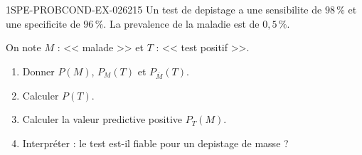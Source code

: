\begin{exercice}{1SPE-PROBCOND-EX-026}{2}{15}
Un test de depistage a une sensibilite de $98\,\%$ et une specificite de $96\,\%$. La prevalence de la maladie est de $0{,}5\,\%$.

On note $M$ : << malade >> et $T$ : << test positif >>.

\begin{enumerate}
  \item Donner $P(M)$, $P_M(T)$ et $P_{\overline{M}}(T)$.
  \item Calculer $P(T)$.
  \item Calculer la valeur predictive positive $P_T(M)$.
  \item Interpréter : le test est-il fiable pour un depistage de masse ?
\end{enumerate}
\end{exercice}
